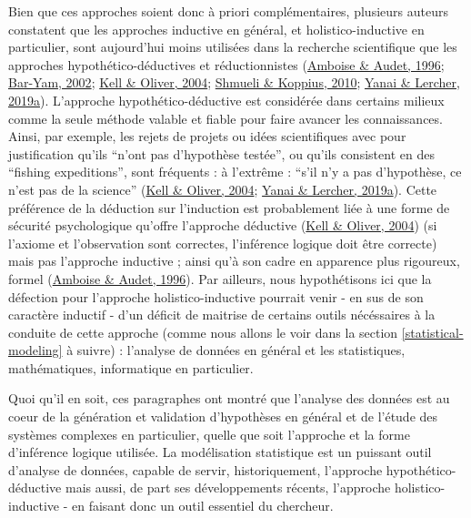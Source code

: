 \documentclass[12pt,twoside]{reedthesis}
\begin{document}
Bien que ces approches soient donc à priori complémentaires, plusieurs auteurs constatent que les approches inductive en général, et holistico-inductive en particulier, sont aujourd'hui moins utilisées dans la recherche scientifique que les approches hypothético-déductives et réductionnistes (\protect\hyperlink{ref-amboise_projet_1996}{Amboise \& Audet, 1996}; \protect\hyperlink{ref-bar-yam_general_nodate}{Bar-Yam, 2002}; \protect\hyperlink{ref-kell_here_2004}{Kell \& Oliver, 2004}; \protect\hyperlink{ref-shmueli_predictive_2010}{Shmueli \& Koppius, 2010}; \protect\hyperlink{ref-yanai_night_2019}{Yanai \& Lercher, 2019a}). L'approche hypothético-déductive est considérée dans certains milieux comme la seule méthode valable et fiable pour faire avancer les connaissances. Ainsi, par exemple, les rejets de projets ou idées scientifiques avec pour justification qu'ils ``n'ont pas d'hypothèse testée'', ou qu'ils consistent en des ``fishing expeditions'', sont fréquents : à l'extrême : ``s'il n'y a pas d'hypothèse, ce n'est pas de la science'' (\protect\hyperlink{ref-kell_here_2004}{Kell \& Oliver, 2004}; \protect\hyperlink{ref-yanai_night_2019}{Yanai \& Lercher, 2019a}). Cette préférence de la déduction sur l'induction est probablement liée à une forme de sécurité psychologique qu'offre l'approche déductive (\protect\hyperlink{ref-kell_here_2004}{Kell \& Oliver, 2004}) (si l'axiome et l'observation sont correctes, l'inférence logique doit être correcte) mais pas l'approche inductive ; ainsi qu'à son cadre en apparence plus rigoureux, formel (\protect\hyperlink{ref-amboise_projet_1996}{Amboise \& Audet, 1996}). Par ailleurs, nous hypothétisons ici que la défection pour l'approche holistico-inductive pourrait venir - en sus de son caractère inductif - d'un déficit de maitrise de certains outils nécéssaires à la conduite de cette approche (comme nous allons le voir dans la section \ref{statistical-modeling} à suivre) : l'analyse de données en général et les statistiques, mathématiques, informatique en particulier.\\

\hfill\break

Quoi qu'il en soit, ces paragraphes ont montré que l'analyse des données est au coeur de la génération et validation d'hypothèses en général et de l'étude des systèmes complexes en particulier, quelle que soit l'approche et la forme d'inférence logique utilisée. La modélisation statistique est un puissant outil d'analyse de données, capable de servir, historiquement, l'approche hypothético-déductive mais aussi, de part ses développements récents, l'approche holistico-inductive - en faisant donc un outil essentiel du chercheur.
\end{document}
